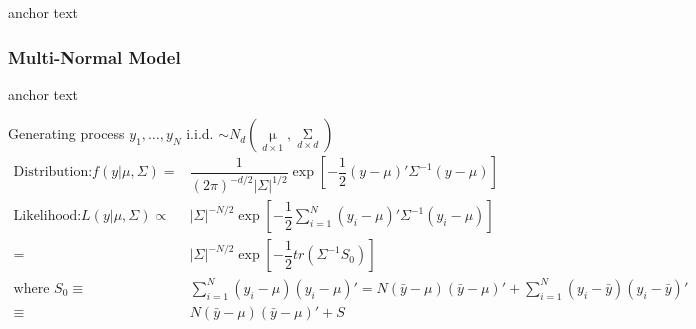     
    

\hypertarget{MultinomConjugate}{anchor text}


\subsubsection{Multi-Normal Model}\label{SubSubSectionBayesianMultinormal}
\hypertarget{MultiNormalConjugate}{anchor text}

Generating process $ y_1,\ldots,y_N $ i.i.d. $ \sim N_d(\mathop{\mu }\limits_{d\times 1}  ,\mathop{\Sigma }\limits_{d\times d} ) $
\begin{align*}
    \text{Distribution:}f(y|\mu ,\Sigma )=&\dfrac{1}{(2\pi)^{-d/2}|\Sigma |^{1/2}}\exp\left[ -\dfrac{1}{2}(y-\mu )'\Sigma ^{-1}(y-\mu ) \right]\\
    \text{Likelihood:}L(y|\mu ,\Sigma )\propto& |\Sigma |^{-N/2}\exp\left[ -\dfrac{1}{2}\sum_{i=1}^N (y_i-\mu )'\Sigma ^{-1}(y_i-\mu ) \right]\\
    =& |\Sigma |^{-N/2}\exp\left[ -\dfrac{1}{2}tr\left(\Sigma ^{-1}S_0
     \right)\right]\\
    \text{where }S_0\equiv &\sum_{i=1}^N(y_i-\mu )(y_i-\mu )'=N(\bar{y}-\mu )(\bar{y}-\mu )'+\sum_{i=1}^N(y_i-\bar{y})(y_i-\bar{y})'\\
    \equiv& N(\bar{y}-\mu )(\bar{y}-\mu )'+S
\end{align*}


